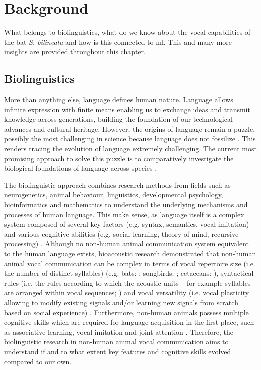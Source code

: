 \chapter{Background}
\label{ch:background}
What belongs to biolinguistics, what do we know about the vocal capabilities of the bat \emph{S. bilineata} and how is this connected to \gls{ml}. This and many more insights are provided throughout this chapter.

\section{Biolinguistics}
More than anything else, language defines human nature. Language allows infinite expression with finite means \cite{Hauser2002Neuroscience:Evolve} enabling us to exchange ideas and transmit knowledge across generations, building the foundation of our technological advances and cultural heritage. However, the origins of language remain a puzzle, possibly the most challenging in science because language does not fossilize \cite{TecumsehFitch2010TheLanguage}. This renders tracing the evolution of language extremely challenging. The current most promising approach to solve this puzzle is to comparatively investigate the biological foundations of language across species \cite{Fitch2018TheAnalysis}.

The biolinguistic approach combines research methods from fields such as neurogenetics, animal behaviour, linguistics, developmental psychology, bioinformatics and mathematics to understand the underlying mechanisms and processes of human language. This make sense, as language itself is a complex system composed of several key factors (e.g. syntax, semantics, vocal imitation) and various cognitive abilities (e.g. social learning, theory of mind, recursive processing) \cite{Fitch2010SocialPhylogenies}.
Although no non-human animal communication system equivalent to the human language exists, bioacoustic research demonstrated that non-human animal vocal communication can be complex in terms of vocal repertoire size (i.e. the number of distinct syllables) (e.g. bats: \cite{Behr2004}; songbirds: \cite{Eens1989TemporalStarling}; cetaceans: \cite{Payne1971SongsWhales}), syntactical rules (i.e. the rules according to which the acoustic units – for example syllables - are arranged within vocal sequences; \cite{Weiss2014})  and vocal versatility (i.e. vocal plasticity allowing to modify existing signals and/or learning new signals from scratch based on social experience) \cite{Wirthlin2019ATrait}. Furthermore, non-human animals possess multiple cognitive skills which are required for language acquisition in the first place, such as associative learning, vocal imitation and joint attention \cite{Fitch2010SocialPhylogenies}. Therefore, the biolinguistic research in non-human animal vocal communication aims to understand if and to what extent key features and cognitive skills evolved compared to our own.

